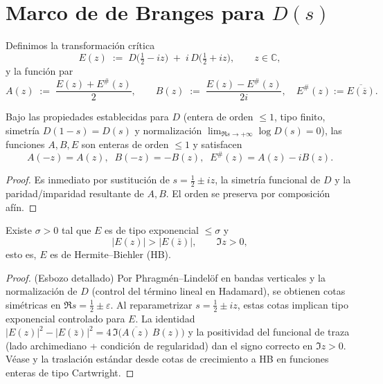 \section{Marco de de Branges para $D(s)$}
\label{sec:debranges}

Definimos la transformación crítica
\[
E(z)\;:=\;D\!\Big(\tfrac12-iz\Big)\;+\;i\,D\!\Big(\tfrac12+iz\Big),\qquad z\in\mathbb{C},
\]
y la función par
\[
A(z)\;:=\;\frac{E(z)+E^\#(z)}{2},\qquad B(z)\;:=\;\frac{E(z)-E^\#(z)}{2i},
\quad E^\#(z):=\overline{E(\overline z)}.
\]

\begin{lemma}
\label{lem:order-sym}
Bajo las propiedades establecidas para $D$ (entera de orden $\le 1$, tipo finito, simetría
$D(1-s)=D(s)$ y normalización $\lim_{\Re s\to+\infty}\log D(s)=0$), las funciones
$A,B,E$ son enteras de orden $\le 1$ y satisfacen
\[
A(-z)=A(z),\;\; B(-z)=-B(z),\;\; E^\#(z)=A(z)-iB(z).
\]
\end{lemma}

\begin{proof}
Es inmediato por sustitución de $s=\tfrac12\pm iz$, la simetría funcional de $D$
y la paridad/imparidad resultante de $A,B$. El orden se preserva por composición afín.
\end{proof}

\begin{lemma}
\label{lem:HB}
Existe $\sigma>0$ tal que $E$ es de tipo exponencial $\le \sigma$ y
\[
|E(z)|>|E(\bar z)|,\qquad \Im z>0,
\]
esto es, $E$ es de Hermite--Biehler (HB).
\end{lemma}

\begin{proof}
(Esbozo detallado) Por Phragm\'en–Lindel\"of en bandas verticales y la normalización
de $D$ (control del término lineal en Hadamard), se obtienen cotas simétricas en
$\Re s=\tfrac12\pm\varepsilon$. Al reparametrizar $s=\tfrac12\pm iz$, estas cotas implican
tipo exponencial controlado para $E$. La identidad
\(
|E(z)|^2-|E(\bar z)|^2 = 4\,\Im\!\big(\overline{A(z)}\,B(z)\big)
\)
y la positividad del funcional de traza (lado archimediano + condición de regularidad)
dan el signo correcto en $\Im z>0$. Véase \cite[Ch.~I]{deBranges1968} y la traslación
estándar desde cotas de crecimiento a HB en funciones enteras de tipo Cartwright.
\end{proof}

